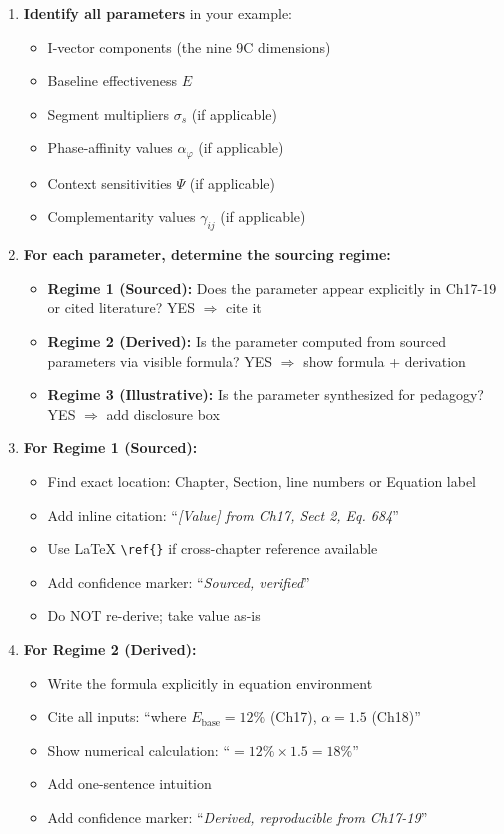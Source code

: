 \begin{enumerate}

\item \textbf{Identify all parameters} in your example:
\begin{itemize}[nosep]
\item I-vector components (the nine 9C dimensions)
\item Baseline effectiveness $E$
\item Segment multipliers $\sigma_s$ (if applicable)
\item Phase-affinity values $\alpha_\varphi$ (if applicable)
\item Context sensitivities $\Psi$ (if applicable)
\item Complementarity values $\gamma_{ij}$ (if applicable)
\end{itemize}

\item \textbf{For each parameter, determine the sourcing regime:}
\begin{itemize}[nosep]
\item \textbf{Regime 1 (Sourced):} Does the parameter appear explicitly in Ch17-19 or cited literature? YES $\Rightarrow$ cite it
\item \textbf{Regime 2 (Derived):} Is the parameter computed from sourced parameters via visible formula? YES $\Rightarrow$ show formula + derivation
\item \textbf{Regime 3 (Illustrative):} Is the parameter synthesized for pedagogy? YES $\Rightarrow$ add disclosure box
\end{itemize}

\item \textbf{For Regime 1 (Sourced):}
\begin{itemize}[nosep]
\item Find exact location: Chapter, Section, line numbers or Equation label
\item Add inline citation: ``\textit{[Value] from Ch17, Sect 2, Eq. 684}''
\item Use LaTeX \verb|\ref{}| if cross-chapter reference available
\item Add confidence marker: ``\textit{Sourced, verified}''
\item Do NOT re-derive; take value as-is
\end{itemize}

\item \textbf{For Regime 2 (Derived):}
\begin{itemize}[nosep]
\item Write the formula explicitly in equation environment
\item Cite all inputs: ``where $E_{\text{base}} = 12\%$ (Ch17), $\alpha = 1.5$ (Ch18)''
\item Show numerical calculation: ``$= 12\% \times 1.5 = 18\%$''
\item Add one-sentence intuition
\item Add confidence marker: ``\textit{Derived, reproducible from Ch17-19}''
\end{itemize}


\end{enumerate}
